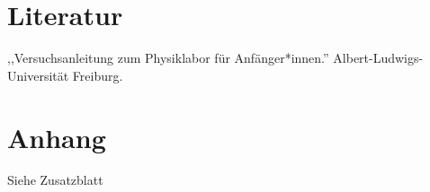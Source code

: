 \documentclass[11pt,a4paper]{article}
\begin{document}
\section{Literatur}
,,Versuchsanleitung zum Physiklabor für Anfänger*innen.'' Albert-Ludwigs-Universität Freiburg. 
	
\section{Anhang}
Siehe Zusatzblatt
	
	
	
\end{document}
